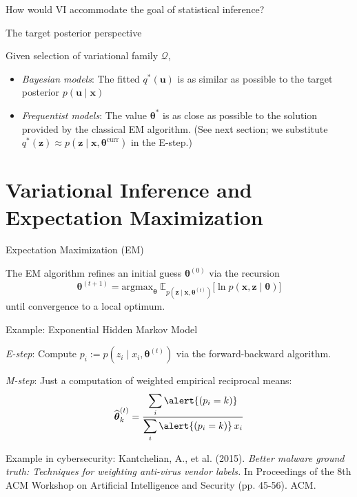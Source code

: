 \documentclass[10pt]{beamer}
\newcommand{\ds}{\displaystyle}
\newcommand{\df}{\displaystyle\frac}
\newcommand{\+}[1]{\ensuremath{{\boldsymbol #1}}} %
\newcommand{\cond}{\; | \;}
\newcommand{\E}{\mathbb{E}}
\newcommand{\Q}{\mathcal{Q}}
\begin{document}
\begin{frame}{How would VI accommodate the goal of statistical inference?}
\begin{block}{The target posterior perspective}

Given selection of variational family $\Q$, 

\begin{itemize}
\item \textit{Bayesian models}: The fitted $q^*(\+u)$  is as similar as possible   to the target  posterior $p(\+u \cond \+x)$
\item \textit{Frequentist models}: The value  $\+\theta^*$ is as close as possible to the solution provided by the classical EM algorithm.  \footnotesize (See next section; we substitute $q^*(\+z) \approx p(\+z\cond \+x, \+\theta^{\text{curr}})$ in the E-step.)
\end{itemize}

\end{block} 
\end{frame}



%
%




\section{Variational Inference and Expectation Maximization}

\begin{frame}{Expectation Maximization (EM)}

The EM algorithm refines an initial guess $\+\theta^{(0)}$ via the recursion
\[ \+\theta^{(t+1)} =  \text{argmax}_{\+\theta} \; \E_{p(\+z \cond \+x , \+\theta^{(t)})} \bigg[ \ln p(\+x, \+z \cond \+\theta) \bigg] \]
until convergence to a local optimum.

 

\begin{block}{Example: Exponential Hidden Markov Model}

\textit{E-step}:  Compute $p_i := p(z_i \cond x_i, \+\theta^{(t)})$ via the forward-backward algorithm. 

\textit{M-step}: Just a computation of \alert{weighted} empirical reciprocal means:
\[ \widehat{\+\theta}_k^{(t)} = \df{\ds\sum_i \alert{(p_i = k)}}{  \ds\sum_i \alert{(p_i = k)} \, x_i} \]
\end{block}

\vfill \vfill

\tiny Example in cybersecurity: Kantchelian, A., et al. (2015). \textit{Better malware ground truth: Techniques for weighting anti-virus vendor labels.} In Proceedings of the 8th ACM Workshop on Artificial Intelligence and Security (pp. 45-56). ACM.


\end{frame}
\end{document}
